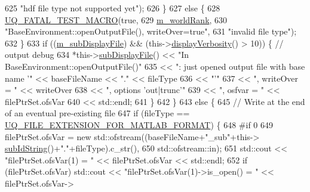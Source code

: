 \begin{DoxyCode}
625                               \textcolor{stringliteral}{"hdf file type not supported yet"});
626         \}
627         \textcolor{keywordflow}{else} \{
628           \hyperlink{_defines_8h_a56d63d18d0a6d45757de47fcc06f574d}{UQ\_FATAL\_TEST\_MACRO}(\textcolor{keyword}{true},
629                               \hyperlink{class_q_u_e_s_o_1_1_base_environment_a464cab923ada0e14c6e3a4000c2ea385}{m\_worldRank},
630                               \textcolor{stringliteral}{"BaseEnvironment::openOutputFile(), writeOver=true"},
631                               \textcolor{stringliteral}{"invalid file type"});
632         \}
633         \textcolor{keywordflow}{if} ((\hyperlink{class_q_u_e_s_o_1_1_base_environment_a52b4275aa8ee85994dd304d9fe95c9c5}{m\_subDisplayFile}) && (this->\hyperlink{class_q_u_e_s_o_1_1_base_environment_a1fe5f244fc0316a0ab3e37463f108b96}{displayVerbosity}() > 10)) \{ \textcolor{comment}{//
       output debug}
634           *this->\hyperlink{class_q_u_e_s_o_1_1_base_environment_a8a0064746ae8dddfece4229b9ad374d6}{subDisplayFile}() << \textcolor{stringliteral}{"In BaseEnvironment::openOutputFile()"}
635                                   << \textcolor{stringliteral}{": just opened output file with base name '"} << baseFileName << \textcolor{stringliteral}{"."} <<
       fileType
636                                   << \textcolor{stringliteral}{"'"}
637                                   << \textcolor{stringliteral}{", writeOver = "} << writeOver
638                                   << \textcolor{stringliteral}{", options 'out|trunc'"}
639                                   << \textcolor{stringliteral}{", osfvar = "} << filePtrSet.ofsVar
640                                   << std::endl;
641         \}
642       \}
643       \textcolor{keywordflow}{else} \{
645         \textcolor{comment}{// Write at the end of an eventual pre-existing file}
647 \textcolor{comment}{}        \textcolor{keywordflow}{if} (fileType == \hyperlink{_defines_8h_ac440026eff7deb1c1eed1eea0e8e36ba}{UQ\_FILE\_EXTENSION\_FOR\_MATLAB\_FORMAT}) \{
648 \textcolor{preprocessor}{#if 0}
649 \textcolor{preprocessor}{}          filePtrSet.ofsVar = \textcolor{keyword}{new} std::ofstream((baseFileName+\textcolor{stringliteral}{"\_sub"}+this->
      \hyperlink{class_q_u_e_s_o_1_1_base_environment_a73f7849acdd5d5ba15a3094fe18f258f}{subIdString}()+\textcolor{stringliteral}{"."}+fileType).c\_str(), 
650                                                 std::ofstream::in);
651           std::cout << \textcolor{stringliteral}{"filePtrSet.ofsVar(1) = "} << filePtrSet.ofsVar << std::endl;
652           \textcolor{keywordflow}{if} (filePtrSet.ofsVar) std::cout << \textcolor{stringliteral}{"filePtrSet.ofsVar(1)->is\_open() = "} << filePtrSet.ofsVar->

\end{DoxyCode}
